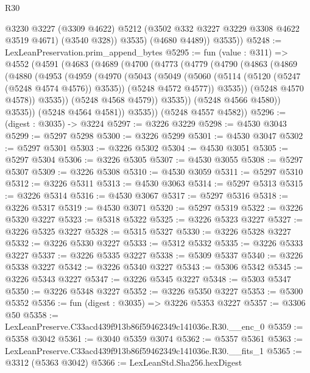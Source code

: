\begin{lexlean}{R30}
\begin{coremodule}
              @3230
              @3227
              (@3309 @4622)
              @5212
              (@3502 @332 @3227 @3229 @3308 @4622 @3519 @4671)
              (@3540 @328))
            @3535)
          (@4680 @4489))
        @3535))
@5248 := LexLeanPreservation.prim_append_bytes
@5295 := fun (value : @311) =>
  @4552
    (@4591
      (@4683
        (@4689
          (@4700
            (@4773
              (@4779
                (@4790
                  (@4863
                    (@4869
                      (@4880
                        (@4953
                          (@4959
                            (@4970
                              (@5043
                                (@5049
                                  (@5060
                                    (@5114 (@5120 (@5247 (@5248 @4574 @4576)) @3535))
                                    (@5248 @4572 @4577))
                                  @3535))
                              (@5248 @4570 @4578))
                            @3535))
                        (@5248 @4568 @4579))
                      @3535))
                  (@5248 @4566 @4580))
                @3535))
            (@5248 @4564 @4581))
          @3535))
      (@5248 @4557 @4582))
@5296 := (digest : @3035) -> @3224
@5297 := @3226 @3229
@5298 := @4530 @3043
@5299 := @5297 @5298
@5300 := @3226 @5299
@5301 := @4530 @3047
@5302 := @5297 @5301
@5303 := @3226 @5302
@5304 := @4530 @3051
@5305 := @5297 @5304
@5306 := @3226 @5305
@5307 := @4530 @3055
@5308 := @5297 @5307
@5309 := @3226 @5308
@5310 := @4530 @3059
@5311 := @5297 @5310
@5312 := @3226 @5311
@5313 := @4530 @3063
@5314 := @5297 @5313
@5315 := @3226 @5314
@5316 := @4530 @3067
@5317 := @5297 @5316
@5318 := @3226 @5317
@5319 := @4530 @3071
@5320 := @5297 @5319
@5322 := @3226 @5320 @3227
@5323 := @5318 @5322
@5325 := @3226 @5323 @3227
@5327 := @3226 @5325 @3227
@5328 := @5315 @5327
@5330 := @3226 @5328 @3227
@5332 := @3226 @5330 @3227
@5333 := @5312 @5332
@5335 := @3226 @5333 @3227
@5337 := @3226 @5335 @3227
@5338 := @5309 @5337
@5340 := @3226 @5338 @3227
@5342 := @3226 @5340 @3227
@5343 := @5306 @5342
@5345 := @3226 @5343 @3227
@5347 := @3226 @5345 @3227
@5348 := @5303 @5347
@5350 := @3226 @5348 @3227
@5352 := @3226 @5350 @3227
@5353 := @5300 @5352
@5356 := fun (digest : @3035) => @3226 @5353 @3227
@5357 := @3306 @50
@5358 := LexLeanPreserve.C33acd439f913b86f59462349c141036e.R30.__enc_0
@5359 := @5358 @3042
@5361 := @3040 @5359 @3074
@5362 := @5357 @5361
@5363 := LexLeanPreserve.C33acd439f913b86f59462349c141036e.R30.__fits_1
@5365 := @3312 (@5363 @3042)
@5366 := LexLeanStd.Sha256.hexDigest

\end{coremodule}
\end{lexlean}
